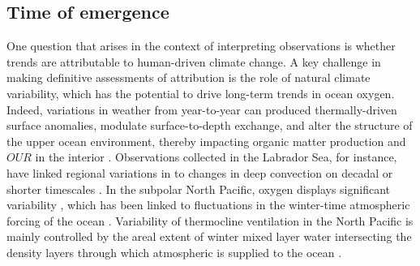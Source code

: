 \documentclass{report_chapter}
\begin{document}
\subsection{Time of emergence}\label{loc:toe}

One question that arises in the context of interpreting observations is whether trends are attributable to human-driven climate change.
A key challenge in making definitive assessments of attribution is the role of natural climate variability, which has the potential to drive long-term trends in ocean oxygen.
Indeed, variations in weather from year-to-year can produced thermally-driven surface \OO{} anomalies, modulate surface-to-depth exchange, and alter the structure of the upper ocean environment, thereby impacting organic matter production and $OUR$ in the interior \citep{Ito-Deutsch-2010,Deutsch-Brix-etal-2011}.
Observations collected in the Labrador Sea, for instance, have linked regional variations in \OO{} to changes in deep convection on decadal or shorter timescales \citep{van-Aken-Femke-de-Jong-etal-2011}.
In the subpolar North Pacific, oxygen  displays significant variability \citep{Deutsch-Emerson-etal-2006}, which has been linked to fluctuations in the winter-time atmospheric forcing of the ocean \citep{Andreev-Baturina-2006}.
Variability of thermocline \OO{} ventilation in the North Pacific is mainly controlled by the areal extent of winter mixed layer water intersecting the density layers through which atmospheric \OO{} is supplied to the ocean \citep{Kwon-Deutsch-etal-2016}.
\end{document}
